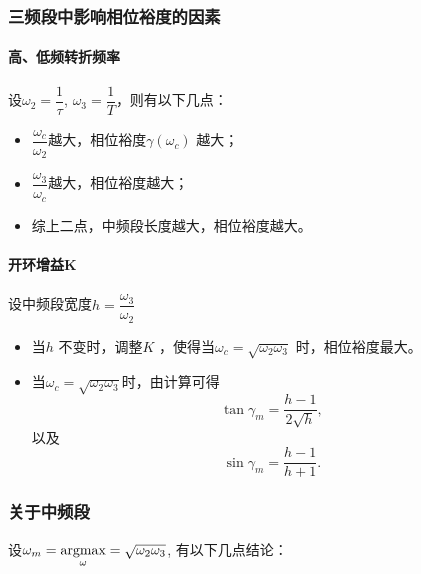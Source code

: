 \documentclass[14pt,a4paper]{article}
\theoremstyle{plain}
\theoremstyle{definition}
\theoremstyle{remark}
\theoremstyle{plain}
\theoremstyle{plain}
\theoremstyle{plain}
\theoremstyle{definition}
\theoremstyle{remark}
\numberwithin{equation}{section}
\begin{document}
			\subsubsection{三频段中影响相位裕度的因素}%
			\label{ssub:三频段中影响相位裕度的因素}
				
				\paragraph{高、低频转折频率}%
				\label{par:高_低频转折频率}

					设$\omega_2=\dfrac{1}{\tau}$, $\omega_3=\dfrac{1}{T}$，则有以下几点：
					\begin{itemize}
						\item $\dfrac{\omega_c}{\omega_2}$越大，相位裕度$\gamma(\omega_c)$ 越大；
						\item $\dfrac{\omega_3}{\omega_c}$越大，相位裕度越大；
						\item 综上二点，中频段长度越大，相位裕度越大。
					\end{itemize} 

				\paragraph{开环增益K}%
				\label{par:开环增益k}
					
					设中频段宽度$h=\dfrac{\omega_3}{\omega_2}$
					\begin{itemize}
						\item 当$h$ 不变时，调整$K$ ，使得当$\omega_c=\sqrt{\omega_2 \omega_3}$ 时，相位裕度最大。 
						\item 当$\omega_c=\sqrt{\omega_2 \omega_3}$时，由计算可得
							\begin{equation}
							\label{eq:tan-y-h}
								\tan \gamma_{m} = \dfrac{h-1}{2\sqrt{h}}
							,\end{equation}
							以及
							\begin{equation}
							\label{eq:sin-y-h2}
								\sin \gamma_{m} = \dfrac{h-1}{h+1}	
							.\end{equation} 
					\end{itemize}

				
			\subsubsection{关于中频段}%
			\label{ssub:关于中频段}
			
				设$\omega_m = \mathop{\textnormal{argmax}}\limits_{\omega} = \sqrt{\omega_2 \omega_3} $, 有以下几点结论：
\end{document}
